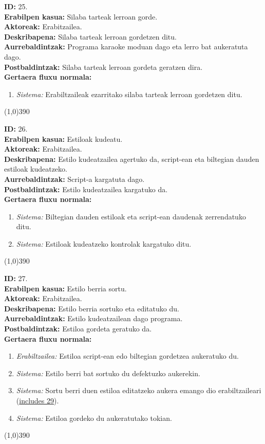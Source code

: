 \noindent
\textbf{ID:} 25.\\
\textbf{Erabilpen kasua:} Silaba tarteak lerroan gorde.\\
\textbf{Aktoreak:} Erabitzailea.\\
\textbf{Deskribapena:} Silaba tarteak lerroan gordetzen ditu.\\
\textbf{Aurrebaldintzak:} Programa karaoke moduan dago eta lerro bat aukeratuta dago.\\
\textbf{Postbaldintzak:} Silaba tarteak lerroan gordeta geratzen dira.\\
\textbf{Gertaera fluxu normala:}
\begin{enumerate}
	\item \textit{Sistema:} Erabiltzaileak ezarritako silaba tarteak lerroan gordetzen ditu.
\end{enumerate}
\line(1,0){390}

\noindent
\textbf{ID:} 26.\\
\textbf{Erabilpen kasua:} Estiloak kudeatu.\\
\textbf{Aktoreak:} Erabitzailea.\\
\textbf{Deskribapena:} Estilo kudeatzailea agertuko da, script-ean eta biltegian dauden estiloak kudeatzeko.\\
\textbf{Aurrebaldintzak:} Script-a kargatuta dago.\\
\textbf{Postbaldintzak:} Estilo kudeatzailea kargatuko da.\\
\textbf{Gertaera fluxu normala:}
\begin{enumerate}
	\item \textit{Sistema:} Biltegian dauden estiloak eta script-ean daudenak zerrendatuko ditu.
	\item \textit{Sistema:} Estiloak kudeatzeko kontrolak kargatuko ditu.
\end{enumerate}
\line(1,0){390}

\noindent
\textbf{ID:} 27.\\
\textbf{Erabilpen kasua:} Estilo berria sortu.\\
\textbf{Aktoreak:} Erabitzailea.\\
\textbf{Deskribapena:} Estilo berria sortuko eta editatuko du.\\
\textbf{Aurrebaldintzak:} Estilo kudeatzailean dago programa.\\
\textbf{Postbaldintzak:} Estiloa gordeta geratuko da.\\
\textbf{Gertaera fluxu normala:}
\begin{enumerate}
	\item \textit{Erabiltzailea:} Estiloa script-ean edo biltegian gordetzea aukeratuko du.
	\item \textit{Sistema:} Estilo berri bat sortuko du defektuzko aukerekin.
	\item \textit{Sistema:} Sortu berri duen estiloa editatzeko aukera emango dio erabiltzaileari (\underline{includes 29}).
	\item \textit{Sistema:} Estiloa gordeko du aukeratutako tokian.
\end{enumerate}
\line(1,0){390}

